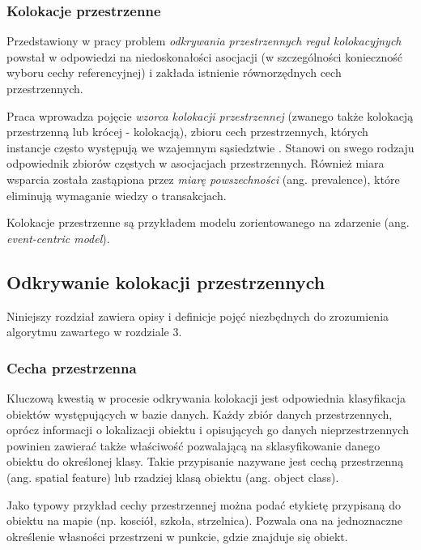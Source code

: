 \documentclass[12pt]{article}
\begin{document}
\subsubsection{Kolokacje przestrzenne}

Przedstawiony w pracy \cite{huang} problem \textit{odkrywania przestrzennych reguł kolokacyjnych} powstał w odpowiedzi na niedoskonałości asocjacji (w szczególności konieczność wyboru cechy referencyjnej) i zakłada istnienie równorzędnych cech przestrzennych. 

Praca wprowadza pojęcie \textit{wzorca kolokacji przestrzennej} (zwanego także kolokacją przestrzenną lub krócej - kolokacją), zbioru cech przestrzennych, których instancje często występują we wzajemnym sąsiedztwie \cite{boinski}. Stanowi on swego rodzaju odpowiednik zbiorów częstych w asocjacjach przestrzennych. Również miara wsparcia została zastąpiona przez \textit{miarę powszechności} (ang. prevalence), które eliminują wymaganie wiedzy o transakcjach. 

Kolokacje przestrzenne są przykładem modelu zorientowanego na zdarzenie (ang. \textit{event-centric model}).

\subsection{Odkrywanie kolokacji przestrzennych}

Niniejszy rozdział zawiera opisy i definicje pojęć niezbędnych do zrozumienia algorytmu zawartego w rozdziale 3.

\subsubsection{Cecha przestrzenna}

Kluczową kwestią w procesie odkrywania kolokacji jest odpowiednia klasyfikacja obiektów występujących w bazie danych. Każdy zbiór danych przestrzennych, oprócz informacji o lokalizacji obiektu i opisujących go danych nieprzestrzennych powinien zawierać także właściwość pozwalającą na sklasyfikowanie danego obiektu do określonej klasy. Takie przypisanie nazywane jest cechą przestrzenną (ang. spatial feature) lub rzadziej klasą obiektu (ang. object class).

Jako typowy przykład cechy przestrzennej można podać etykietę przypisaną do obiektu na mapie (np. kosciół, szkoła, strzelnica). Pozwala ona na jednoznaczne określenie własności przestrzeni w punkcie, gdzie znajduje się obiekt.
\end{document}
